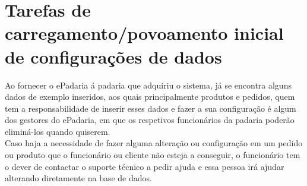 \section{Tarefas de carregamento/povoamento inicial de configurações de dados}
Ao fornecer o ePadaria á padaria que adquiriu o sistema, já se encontra alguns dados de exemplo inseridos, aos quais principalmente produtos e pedidos, quem tem a responsabilidade de inserir esses dados e fazer a sua configuração é algum dos gestores do ePadaria, em que os respetivos funcionários da padaria poderão eliminá-los quando quiserem. \\
Caso haja a necessidade de fazer alguma alteração ou configuração em um pedido ou produto que o funcionário ou cliente não esteja a conseguir, o funcionário tem o dever de contactar o suporte técnico a pedir ajuda e essa pessoa irá ajudar alterando diretamente na base de dados.

